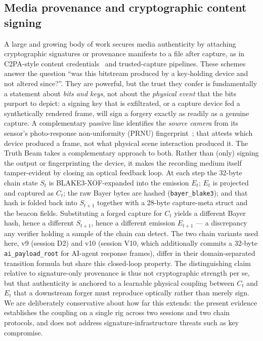 \subsection{Media provenance and cryptographic content signing}
A large and growing body of work secures media authenticity by attaching cryptographic signatures or provenance manifests to a file after capture, as in C2PA-style content credentials~\cite{c2pa} and trusted-capture pipelines. These schemes answer the question ``was this bitstream produced by a key-holding device and not altered since?''. They are powerful, but the trust they confer is fundamentally a statement about \emph{bits and keys}, not about the \emph{physical event} that the bits purport to depict: a signing key that is exfiltrated, or a capture device fed a synthetically rendered frame, will sign a forgery exactly as readily as a genuine capture. A complementary passive line identifies the \emph{source camera} from its sensor's photo-response non-uniformity (PRNU) fingerprint~\cite{lukas2006prnu}; that attests which device produced a frame, not what physical scene interaction produced it. The Truth Beam takes a complementary approach to both. Rather than (only) signing the output or fingerprinting the device, it makes the recording medium itself tamper-evident by closing an optical feedback loop. At each step the 32-byte chain state $S_t$ is BLAKE3-XOF-expanded \cite{blake3} into the emission $E_t$; $E_t$ is projected and captured as $C_t$; the raw Bayer bytes are hashed (\texttt{bayer\_blake3}); and that hash is folded back into $S_{t+1}$ together with a 28-byte capture-meta struct and the beacon fields. Substituting a forged capture for $C_t$ yields a different Bayer hash, hence a different $S_{t+1}$, hence a different emission $E_{t+1}$ --- a discrepancy any verifier holding a sample of the chain can detect. The two chain variants used here, v9 (session D2) and v10 (session V10, which additionally commits a 32-byte \texttt{ai\_payload\_root} for AI-agent response frames), differ in their domain-separated transition formula but share this closed-loop property. The distinguishing claim relative to signature-only provenance is thus not cryptographic strength per se, but that authenticity is anchored to a learnable physical coupling between $C_t$ and $E_t$ that a downstream forger must reproduce optically rather than merely sign. We are deliberately conservative about how far this extends: the present evidence establishes the coupling on a single rig across two sessions and two chain protocols, and does not address signature-infrastructure threats such as key compromise.

